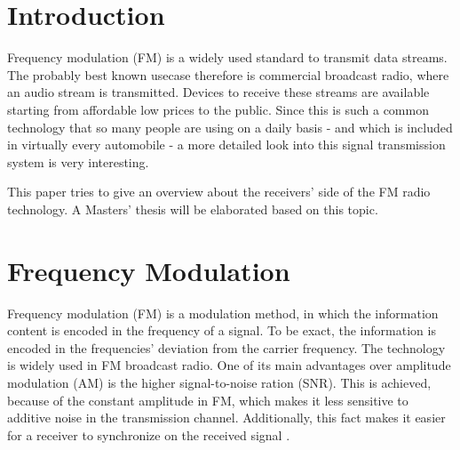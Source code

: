 \documentclass[conference]{IEEEtran}
\begin{document}
\section{Introduction}

  Frequency modulation (FM) is a widely used standard to transmit data streams.
  The probably best known usecase therefore is commercial broadcast radio, where an audio stream is transmitted.
  Devices to receive these streams are available starting from affordable low prices to the public.
  Since this is such a common technology that so many people are using on a daily basis - and which is included in virtually every automobile - a more detailed look into this signal transmission system is very interesting.

  This paper tries to give an overview about the receivers' side of the FM radio technology.
  A Masters' thesis will be elaborated based on this topic.

%
%
%
%

  \section{Frequency Modulation}
    Frequency modulation (FM) is a modulation method, in which the information content is encoded in the frequency of a signal.
    To be exact, the information is encoded in the frequencies' deviation from the carrier frequency.
    The technology is widely used in FM broadcast radio.
    One of its main advantages over amplitude modulation (AM) is the higher signal-to-noise ration (SNR).
    This is achieved, because of the constant amplitude in FM, which makes it less sensitive to additive noise in the transmission channel.
    Additionally, this fact makes it easier for a receiver to synchronize on the received signal \cite{ref_FM_Maths_Info_1}.
\end{document}
